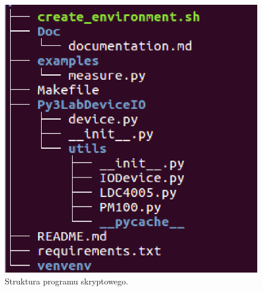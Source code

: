 \begin{figure}
\center
  \includegraphics[scale=0.3]{tree.eps}
  \caption{Struktura programu skryptowego.}
  \label{struktura_rys_1}
\end{figure}
